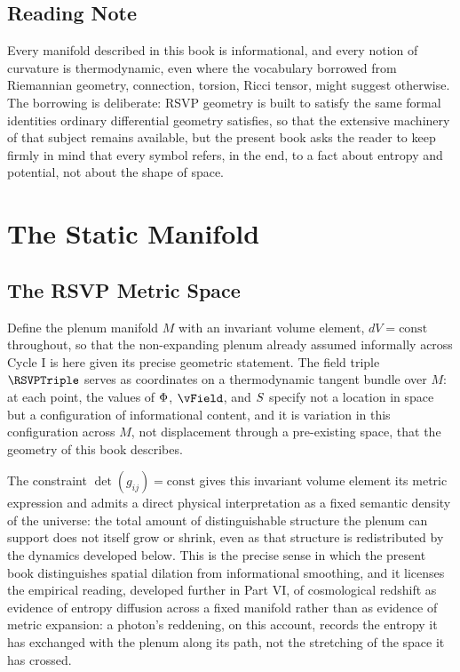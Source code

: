 \chapter*{Reading Note}

Every manifold described in this book is informational, and every notion of curvature is thermodynamic, even where the vocabulary borrowed from Riemannian geometry, connection, torsion, Ricci tensor, might suggest otherwise. The borrowing is deliberate: RSVP geometry is built to satisfy the same formal identities ordinary differential geometry satisfies, so that the extensive machinery of that subject remains available, but the present book asks the reader to keep firmly in mind that every symbol refers, in the end, to a fact about entropy and potential, not about the shape of space.

\part{The Static Manifold}

\chapter{The RSVP Metric Space}

Define the plenum manifold $M$ with an invariant volume element, $dV = \text{const}$ throughout, so that the non-expanding plenum already assumed informally across Cycle I is here given its precise geometric statement. The field triple $\RSVPTriple$ serves as coordinates on a thermodynamic tangent bundle over $M$: at each point, the values of $\Phi$, $\vField$, and $S$ specify not a location in space but a configuration of informational content, and it is variation in this configuration across $M$, not displacement through a pre-existing space, that the geometry of this book describes.

The constraint $\det(g_{ij}) = \text{const}$ gives this invariant volume element its metric expression and admits a direct physical interpretation as a fixed semantic density of the universe: the total amount of distinguishable structure the plenum can support does not itself grow or shrink, even as that structure is redistributed by the dynamics developed below. This is the precise sense in which the present book distinguishes spatial dilation from informational smoothing, and it licenses the empirical reading, developed further in Part VI, of cosmological redshift as evidence of entropy diffusion across a fixed manifold rather than as evidence of metric expansion: a photon's reddening, on this account, records the entropy it has exchanged with the plenum along its path, not the stretching of the space it has crossed.

